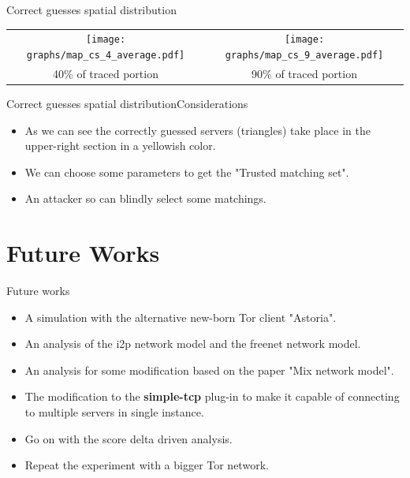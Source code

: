 	\begin{frame}{Correct guesses spatial distribution}{}
		\begin{minipage}{.9\textwidth}
			\begin{tabular}{c c}
				\texttt{[image: graphs/map\_cs\_4\_average.pdf]} &
				\texttt{[image: graphs/map\_cs\_9\_average.pdf]} \\
				40\% of traced portion &
				90\% of traced portion
			\end{tabular}
		\end{minipage}
	\end{frame}

	\begin{frame}{Correct guesses spatial distribution}{Considerations}
		\begin{itemize}
			\item As we can see the correctly guessed servers (triangles) take place
			      in the upper-right section in a yellowish color.
			\item We can choose some parameters to get the "Trusted matching set".
			\item An attacker so can blindly select some matchings.
		\end{itemize}
	\end{frame}

\section{Future Works}
\begin{frame}{Future works}{}
	\begin{itemize}
		\item A simulation with the alternative new-born Tor client "Astoria".
		\item An analysis of the i2p network model and the freenet network model.
		\item An analysis for some modification based on the paper "Mix network model".
		\item The modification to the \textbf{simple-tcp} plug-in to make it
		      capable of connecting to multiple servers in single instance.
		\item Go on with the score delta driven analysis.
		\item Repeat the experiment with a bigger Tor network.
	\end{itemize}
\end{frame}

{
\aauwavesbg
\begin{frame}
\end{frame}
}
